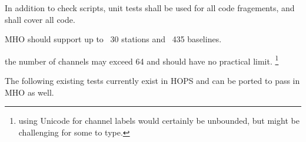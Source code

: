 In addition to check scripts, unit tests shall be used for all code fragements, 
and shall cover all code.


\begin{description}
 \ac{MHO} should support up to
    \TBD~30 stations and \TBD~435 baselines.
    
 the number of \acsp{channel} may exceed 64 and should
    have no practical limit.
    \footnote{using \acs{Unicode} for channel labels would certainly
    be unbounded, but might be challenging for some to type.}

%
\end{description}

The following existing tests currently exist in \ac{HOPS}
and can be ported to pass in \ac{MHO} as well.

